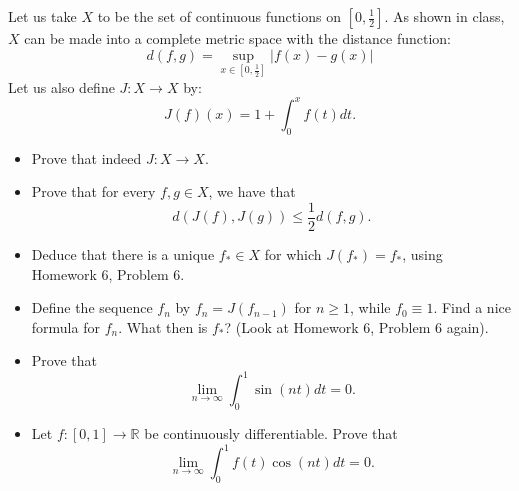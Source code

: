   \begin{exercise}
    Let us take $X$ to be the set of continuous functions on $[0, \frac{1}{2}]$. As shown in class, $X$ can be made into a complete metric space with the distance function:
    \begin{equation}
      d(f, g) = \sup_{x\in[0, \frac{1}{2}]} |f(x) - g(x)|
    \end{equation}
    Let us also define $J : X \to X$ by:
    \begin{equation}
      J(f)(x) = 1 + \int_0^x f(t)dt.
    \end{equation}
    \begin{itemize}
      \item Prove that indeed $J : X \to X$.
      \item Prove that for every $f, g \in X$, we have that
      \begin{equation}
        d(J(f), J(g)) \leq \frac{1}{2}d(f, g).
      \end{equation}
      \item Deduce that there is a unique $f_* \in X$ for which $J(f_*) = f_*$, using Homework 6, Problem 6.
      \item Define the sequence $f_n$ by $f_n = J(f_{n-1})$ for $n \geq 1$, while $f_0 \equiv 1$. Find a nice formula for $f_n$. What then is $f_*$? (Look at Homework 6, Problem 6 again).
    \end{itemize}
  \end{exercise}
  \begin{solution}

  \end{solution}

  \begin{exercise}
    \begin{itemize}
      \item Prove that
      \begin{equation}
        \lim_{n\to\infty} \int_0^1 \sin(nt)dt = 0.
      \end{equation}
      \item Let $f : [0, 1] \to \mathbb{R}$ be continuously differentiable. Prove that
      \begin{equation}
        \lim_{n\to\infty} \int_0^1 f(t) \cos(nt)dt = 0.
      \end{equation}
    \end{itemize}
  \end{exercise}
  \begin{solution}

  \end{solution}

